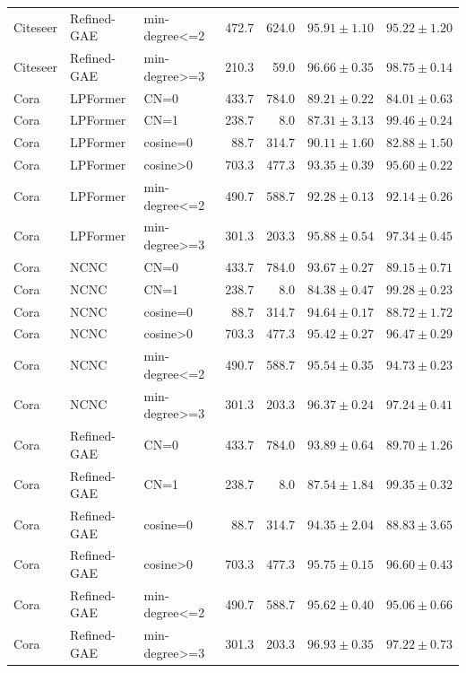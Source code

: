 {\begin{longtable}{lllrrrr}
Citeseer & Refined-GAE & min-degree<=2 & 472.7 & 624.0 & $95.91\pm1.10$ & $95.22\pm1.20$ \\
Citeseer & Refined-GAE & min-degree>=3 & 210.3 & 59.0 & $96.66\pm0.35$ & $98.75\pm0.14$ \\
Cora & LPFormer & CN=0 & 433.7 & 784.0 & $89.21\pm0.22$ & $84.01\pm0.63$ \\
Cora & LPFormer & CN=1 & 238.7 & 8.0 & $87.31\pm3.13$ & $99.46\pm0.24$ \\
Cora & LPFormer & cosine=0 & 88.7 & 314.7 & $90.11\pm1.60$ & $82.88\pm1.50$ \\
Cora & LPFormer & cosine>0 & 703.3 & 477.3 & $93.35\pm0.39$ & $95.60\pm0.22$ \\
Cora & LPFormer & min-degree<=2 & 490.7 & 588.7 & $92.28\pm0.13$ & $92.14\pm0.26$ \\
Cora & LPFormer & min-degree>=3 & 301.3 & 203.3 & $95.88\pm0.54$ & $97.34\pm0.45$ \\
Cora & NCNC & CN=0 & 433.7 & 784.0 & $93.67\pm0.27$ & $89.15\pm0.71$ \\
Cora & NCNC & CN=1 & 238.7 & 8.0 & $84.38\pm0.47$ & $99.28\pm0.23$ \\
Cora & NCNC & cosine=0 & 88.7 & 314.7 & $94.64\pm0.17$ & $88.72\pm1.72$ \\
Cora & NCNC & cosine>0 & 703.3 & 477.3 & $95.42\pm0.27$ & $96.47\pm0.29$ \\
Cora & NCNC & min-degree<=2 & 490.7 & 588.7 & $95.54\pm0.35$ & $94.73\pm0.23$ \\
Cora & NCNC & min-degree>=3 & 301.3 & 203.3 & $96.37\pm0.24$ & $97.24\pm0.41$ \\
Cora & Refined-GAE & CN=0 & 433.7 & 784.0 & $93.89\pm0.64$ & $89.70\pm1.26$ \\
Cora & Refined-GAE & CN=1 & 238.7 & 8.0 & $87.54\pm1.84$ & $99.35\pm0.32$ \\
Cora & Refined-GAE & cosine=0 & 88.7 & 314.7 & $94.35\pm2.04$ & $88.83\pm3.65$ \\
Cora & Refined-GAE & cosine>0 & 703.3 & 477.3 & $95.75\pm0.15$ & $96.60\pm0.43$ \\
Cora & Refined-GAE & min-degree<=2 & 490.7 & 588.7 & $95.62\pm0.40$ & $95.06\pm0.66$ \\
Cora & Refined-GAE & min-degree>=3 & 301.3 & 203.3 & $96.93\pm0.35$ & $97.22\pm0.73$ \\
\end{longtable}
}
